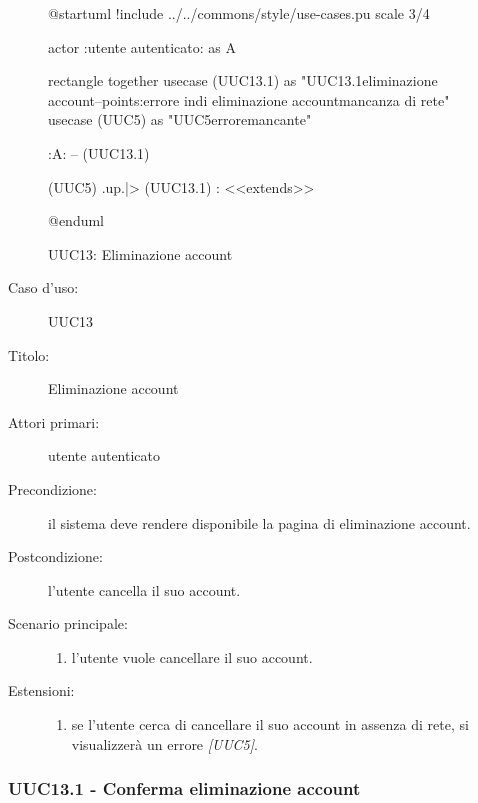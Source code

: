 \documentclass[../../../analisi-dei-requisiti.tex]{subfiles}
\begin{document}
\begin{figure}[h!]
  \centering
  \begin{plantuml}
  @startuml
  !include ../../commons/style/use-cases.pu
  scale 3/4

  actor :utente autenticato: as A

  rectangle {
    together {
      usecase (UUC13.1) as "UUC13.1\nConferma eliminazione account\n--\nExtension points:\nVisualizzazione errore in\ncaso di eliminazione account\nin mancanza di rete"
      usecase (UUC5) as "UUC5\nVisualizzazione errore\nrete mancante"
    }
  }

  :A: -- (UUC13.1)

  (UUC5) .up.|> (UUC13.1) : <<extends>>

  @enduml
  \end{plantuml}
  \caption{UUC13: Eliminazione account}
  \label{fig:uuc13}
\end{figure}

\begin{description}
  \item[Caso d’uso:] UUC13
  \item[Titolo:] Eliminazione account
  \item[Attori primari:] utente autenticato
  \item[Precondizione:] il sistema deve rendere disponibile la pagina di eliminazione account.
  \item[Postcondizione:] l'utente cancella il suo account.
  \item[Scenario principale:]
        \begin{enumerate}
          \item l'utente vuole cancellare il suo account.
        \end{enumerate}
        \item[Estensioni:]
        \begin{enumerate}
          \item se l'utente cerca di cancellare il suo account in assenza di rete, si visualizzerà un errore \emph{[UUC5]}.
        \end{enumerate}
\end{description}

\subsubsection{UUC13.1 - Conferma eliminazione account}%
\label{subsub:UUC13.1utente}
\end{document}
